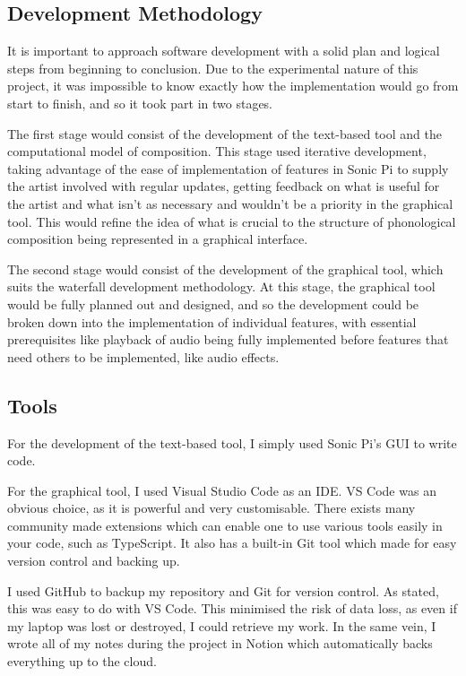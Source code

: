 \documentclass[12pt,a4paper,oneside,openright]{report}
\begin{document}
\subsection{Development Methodology}
It is important to approach software development with a solid plan and logical steps from beginning to conclusion. Due to the experimental nature of this project, it was impossible to know exactly how the implementation would go from start to finish, and so it took part in two stages. 

The first stage would consist of the development of the text-based tool and the computational model of composition. This stage used iterative development, taking advantage of the ease of implementation of features in Sonic Pi to supply the artist involved with regular updates, getting feedback on what is useful for the artist and what isn't as necessary and wouldn't be a priority in the graphical tool. This would refine the idea of what is crucial to the structure of phonological composition being represented in a graphical interface.

The second stage would consist of the development of the graphical tool, which suits the waterfall development methodology. At this stage, the graphical tool would be fully planned out and designed, and so the development could be broken down into the implementation of individual features, with essential prerequisites like playback of audio being fully implemented before features that need others to be implemented, like audio effects.

\subsection{Tools}
For the development of the text-based tool, I simply used Sonic Pi's GUI to write code.

For the graphical tool, I used Visual Studio Code as an IDE. VS Code was an obvious choice, as it is powerful and very customisable. There exists many community made extensions which can enable one to use various tools easily in your code, such as TypeScript. It also has a built-in Git tool which made for easy version control and backing up.

I used GitHub to backup my repository and Git for version control. As stated, this was easy to do with VS Code. This minimised the risk of data loss, as even if my laptop was lost or destroyed, I could retrieve my work. In the same vein, I wrote all of my notes during the project in Notion which automatically backs everything up to the cloud.
\end{document}
